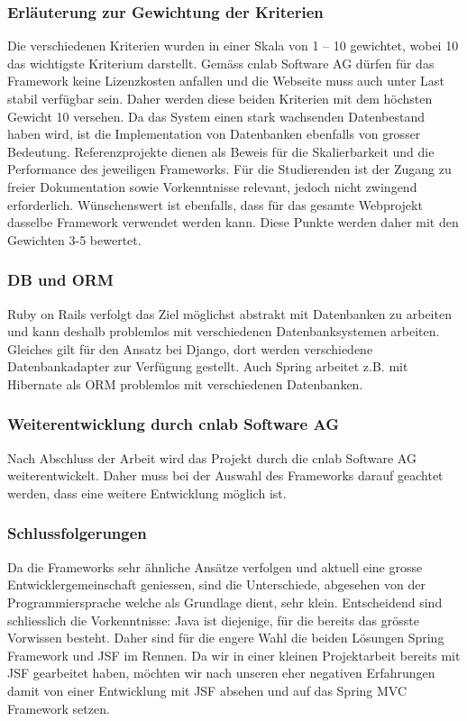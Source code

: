 \subsubsection{Erläuterung zur Gewichtung der Kriterien}
Die verschiedenen Kriterien wurden in einer Skala von 1 – 10 gewichtet, wobei 10 das wichtigste Kriterium darstellt. Gemäss cnlab Software AG dürfen für das Framework keine Lizenzkosten anfallen und die Webseite muss auch unter Last stabil verfügbar sein. Daher werden diese beiden Kriterien mit dem höchsten Gewicht 10 versehen.
Da das System einen stark wachsenden Datenbestand haben wird, ist die Implementation von Datenbanken ebenfalls von grosser Bedeutung. Referenzprojekte dienen als Beweis für die Skalierbarkeit und die Performance des jeweiligen Frameworks.
Für die Studierenden ist der Zugang zu freier Dokumentation sowie Vorkenntnisse relevant, jedoch nicht zwingend erforderlich. Wünschenswert ist ebenfalls, dass für das gesamte Webprojekt dasselbe Framework verwendet werden kann. Diese Punkte werden daher mit den Gewichten 3-5 bewertet.
\subsubsection{DB und ORM}
Ruby on Rails verfolgt das Ziel möglichst abstrakt mit Datenbanken zu arbeiten und kann deshalb problemlos mit verschiedenen Datenbanksystemen arbeiten. Gleiches gilt für den Ansatz bei Django, dort werden verschiedene Datenbankadapter zur Verfügung gestellt. Auch Spring arbeitet z.B. mit Hibernate als ORM problemlos mit verschiedenen Datenbanken.
\subsubsection{Weiterentwicklung durch cnlab Software AG}
Nach Abschluss der Arbeit wird das Projekt durch die cnlab Software AG weiterentwickelt. Daher muss bei der Auswahl des Frameworks darauf geachtet werden, dass eine weitere Entwicklung möglich ist.
\subsubsection{Schlussfolgerungen}
Da die Frameworks sehr ähnliche Ansätze verfolgen und aktuell eine grosse Entwicklergemeinschaft geniessen, sind die Unterschiede, abgesehen von der Programmiersprache welche als Grundlage dient, sehr klein. Entscheidend sind schliesslich die Vorkenntnisse: Java ist diejenige, für die bereits das grösste Vorwissen besteht. Daher sind für die engere Wahl die beiden Lösungen Spring Framework und JSF im Rennen. Da wir in einer kleinen Projektarbeit bereits mit JSF gearbeitet haben, möchten wir nach unseren eher negativen Erfahrungen damit von einer Entwicklung mit JSF absehen und auf das Spring MVC Framework setzen.

